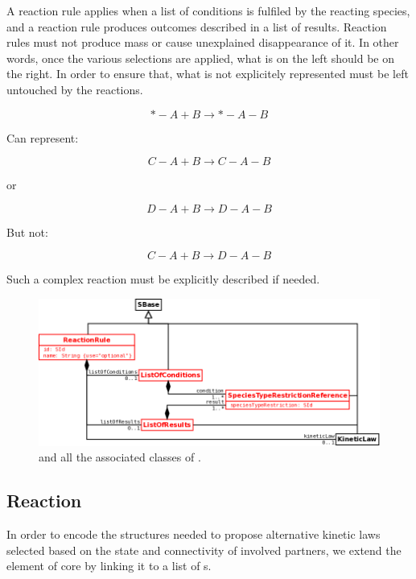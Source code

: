 A reaction rule applies when a list of conditions is fulfiled by the reacting species, and a reaction rule produces outcomes described in a list of results. Reaction rules must not produce mass or cause unexplained disappearance of it. In other words, once the various selections are applied, what is on the left should be on the right. In order to ensure that, what is not explicitely represented must be left untouched by the reactions. 

\[*-A + B \rightarrow *-A-B\]

Can represent:

\[C-A + B \rightarrow C-A-B\]

or

\[D-A + B \rightarrow D-A-B\]

But not:

\[C-A + B \rightarrow D-A-B\]

Such a complex reaction must be explicitly described if needed.

\begin{figure}[h!]
\begin{center}
\includegraphics[scale=0.3]{./figs/pngs/ReactionRuleGeneral.png}
\caption{ and all the associated classes of \multiVone.}
\end{center}
\end{figure}

\subsection{Reaction}

In order to encode the structures needed to propose alternative kinetic laws selected based on the state and connectivity of involved partners, we extend the element  of \sbmlLthreeVone core by linking it to a list of s.

